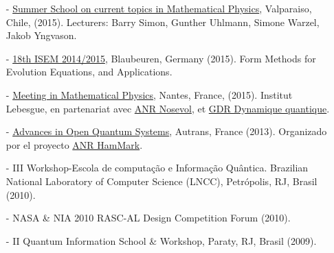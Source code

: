 \documentclass[10pt]{article}
\begin{document}
\begin{itemize}

\item[-] \href{http://www.fis.puc.cl/~smp2015/frontpage.html}{Summer School on current topics in Mathematical Physics}, Valparaiso, Chile, (2015). Lecturers: Barry Simon, Gunther Uhlmann, Simone Warzel, Jakob Yngvason.

\item[-] \href{http://www.math.kit.edu/iana3/page/isem/en}{18th ISEM 2014/2015}, Blaubeuren, Germany (2015). Form Methods for Evolution Equations, and Applications.

\item[-] \href{http://www.lebesgue.fr/content/sem2015-math-phy}{Meeting in Mathematical Physics}, Nantes, France, (2015). Institut Lebesgue, en partenariat avec \href{http://www.math.sciences.univ-nantes.fr/NOSEVOL/node/2}{ANR Nosevol}, et \href{http://www.math.sciences.univ-nantes.fr/dynqua/Accueil}{GDR Dynamique quantique}.

\item[-] \href{http://pillet.univ-tln.fr/aoqs/www/}{Advances in Open Quantum Systems}, Autrans, France (2013). Organizado por el proyecto \href{http://bruneau.u-cergy.fr/ANR/ANR.html}{ANR HamMark}.

\item[-] III Workshop-Escola de computação e Informação Quântica. Brazilian National Laboratory of Computer Science (LNCC), Petrópolis, RJ, Brasil (2010).

\item[-] NASA \& NIA 2010 RASC-AL Design Competition Forum (2010). 

\item[-] II Quantum Information School \& Workshop, Paraty, RJ, Brasil (2009).

\end{itemize}
\end{document}
